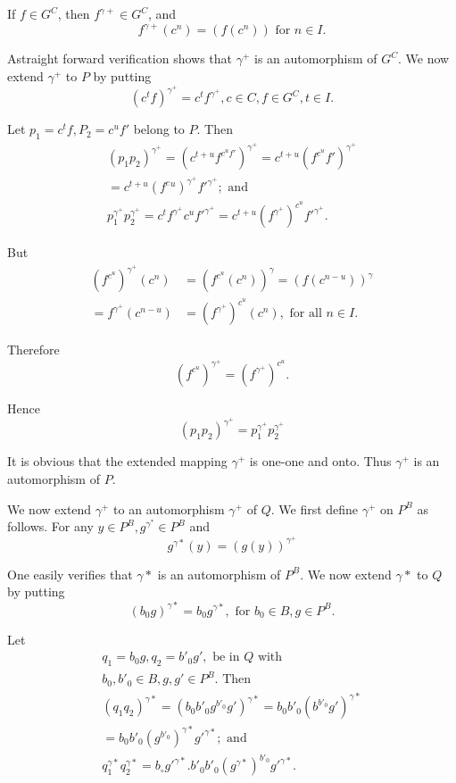 If $f \in  G^C$, then $f^{\gamma +} \in  G^C$, and 
$$
f^{\gamma+} (c^n) = (f(c^n)) \text{ for } n \in  I.
$$ 

A\pageoriginale straight forward verification shows that $\gamma^+$ is an
automorphism of $G^C$. We now extend $\gamma^+$ to $P$ by putting  
$$
(c^tf)^{\gamma^+} = c^t f^{\gamma^+}, c \in  C, f \in 
G^C, t \in  I. 
$$

Let $p_1 = c^t f,  P_2 = c^u f'$ belong to $P$. Then 
\begin{gather*}
  (p_1 p_2)^{\gamma ^{+}} = (c^{t+u } f^{c^{u} f'})^{\gamma^{+} } =
  c^{t+u} (f^{c^{u}}f' )^{\gamma^{+}}\\ 
  = c^{t + u} (f^c{^u})^{\gamma^{+}} f'^{\gamma^{+}}; \text{ and }\\
  p_1^{\gamma ^{+}} p_2^{\gamma^{+}} = c^t f^{\gamma^{+}} c^u
  f'^{\gamma^{+}} = c^{t+u} (f^{\gamma^{+}})^{c^u} f'^{\gamma^{+}}. 
\end{gather*}

But
\begin{align*}
  (f^{c^u})^{\gamma^{+}} (c^n) & = (f^{c^{u}}(c^n))^{\gamma} = (f(c^{n - u}))^{\gamma}\\
  = f^{\gamma^{+}} (c^{n-u}) & = (f^{\gamma^{+}})^{c^u} (c^n),
  \text{ for all } n \in  I. 
\end{align*}

Therefore 
$$
(f^{c^{u}})^{\gamma^{+}} = (f^{\gamma^{+}})^{c^{u}}.
$$

Hence\pageoriginale
$$
(p_1 p_2)^{\gamma^{+}}  = p_1^{\gamma^{+}} p_2^{\gamma^{+}}
$$

It is obvious that the extended mapping ${\gamma^{+}}$ is one-one and
onto. Thus ${\gamma^{+}}$ is an automorphism of $P$. 

We now extend ${\gamma^{+}}$ to an automorphism ${\gamma^{+}}$ of
$Q$. We first define ${\gamma^{+}}$ on $P^B$ as follows. For any $y
\in  P^B, g^{\gamma^{*}} \in  P^B$ and  
$$
g^{\gamma*} (y) = (g(y))^{\gamma^{+}}
$$

One easily verifies that ${\gamma*}$ is an automorphism of $P^B$. We
now extend ${\gamma*}$ to $Q$ by putting 
$$
(b_0g)^{\gamma*} = b_0 g^{\gamma*}, \text{ for } b_0 \in  B, g
\in  P^B. 
$$

Let 
\begin{gather*}
  q_1 = b_0 g, q_2 = b'_0 g', \text{ be in } Q \text{ with }\\
  b_0, b'_0 \in  B, g,g' \in  P^B. \text{ Then }\\
  (q_1 q_2)^{\gamma*} = (b_0 b'_0 g^{b'_{0}} g')^{\gamma*} = b_0 b'_0
  (b^{b'_0} g')^{\gamma*}\\ 
  = b_0 b'_0 (g^{b'_0})^{\gamma*} g'^{\gamma*}; \text{ and }\\
  q_1^{\gamma*} q_2^{\gamma*} = b_\circ g'^{\gamma*}. b'_0 b'_0 (g^{\gamma*})^
  {b'_0} g'^{\gamma*}.
\end{gather*}

